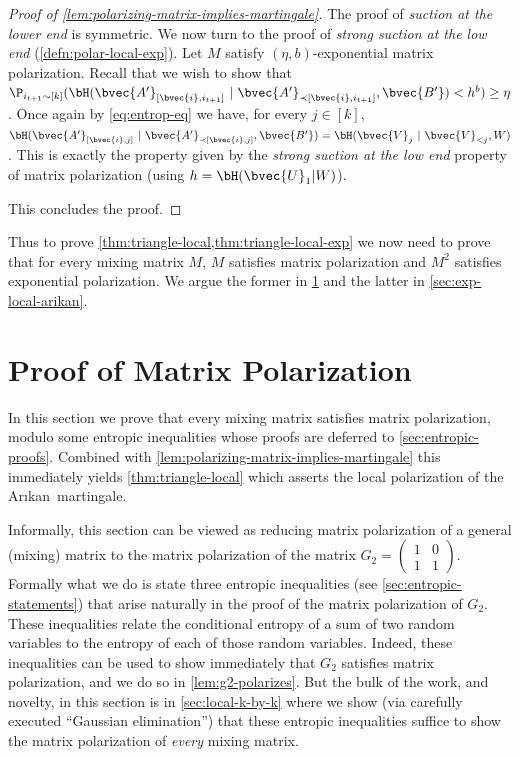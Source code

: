 \documentclass[11pt]{article}
\newcommand{\Arikan}{Ar\i kan}
\begin{document}
\begin{proof}[Proof of \cref{lem:polarizing-matrix-implies-martingale}]
	The proof of \emph{suction at the lower end} is symmetric. We now turn to the proof of \emph{strong suction at the low end} (\cref{defn:polar-local-exp}).
	Let $M$ satisfy $(\eta, b)$-exponential matrix polarization. Recall that we wish to show that $\P_{i_{t+1} \sim [k]}(\bH(\bvec{A'}_{ [\bvec{i}, i_{t+1}]} ~|~ \bvec{A'}_{\prec [\bvec{i}, i_{t+1}]}, \bvec{B'}) < h^b) \geq \eta$.
	Once again by \cref{eq:entrop-eq} we have, for every $j \in [k]$, $\bH(\bvec{A'}_{ [\bvec{i}, j]} ~|~ \bvec{A'}_{\prec [\bvec{i}, j]}, \bvec{B'})= \bH(\bvec{V}_j ~|~ \bvec{V}_{<j},W)$. This is exactly the property given by the \emph{strong suction at the low end} property of matrix polarization (using $h = \bH(\bvec{U}_1|W)$). 
	
	This concludes the proof.
\end{proof}


Thus to prove \cref{thm:triangle-local,thm:triangle-local-exp} we now need to prove that for every mixing matrix $M$, $M$ satisfies matrix polarization and $M^2$ satisfies exponential polarization. 
We argue the former in \cref{sec:matrix-polar} and the latter in \cref{sec:exp-local-arikan}.



\section{Proof of Matrix Polarization}\label{sec:matrix-polar}

In this section we prove that every mixing matrix satisfies matrix polarization, 
modulo some entropic inequalities whose proofs are deferred to
\cref{sec:entropic-proofs}. 
Combined with \cref{lem:polarizing-matrix-implies-martingale} this immediately yields \cref{thm:triangle-local} which asserts the local polarization of the \Arikan\ martingale. 

Informally, this section can be viewed as reducing matrix polarization of a general (mixing) matrix to the matrix polarization of the matrix 
$G_2 = \left(\begin{smallmatrix} 1 & 0 \\ 1 & 1 \end{smallmatrix}\right)$. Formally what we do is state three entropic inequalities
(see \cref{sec:entropic-statements}) 
that arise naturally in the proof of the matrix polarization of $G_2$. These inequalities relate the conditional entropy of a sum of two random variables to the entropy of each of those random variables. Indeed, these inequalities can be used to show immediately that $G_2$ satisfies matrix polarization, and we do so in \cref{lem:g2-polarizes}.
But the bulk of the work, and novelty, in this section is in \cref{sec:local-k-by-k} where we show (via carefully executed ``Gaussian elimination'') that these entropic inequalities suffice to show the matrix polarization of \emph{every} mixing matrix.
\end{document}
